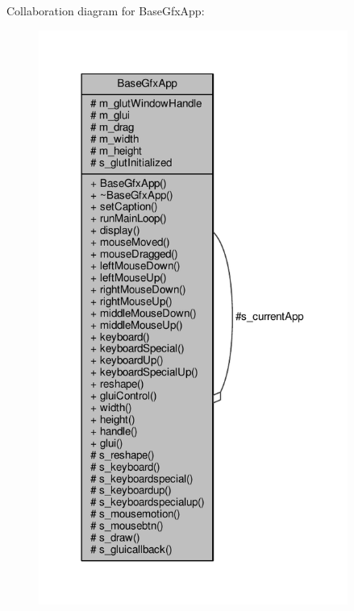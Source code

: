 Collaboration diagram for Base\-Gfx\-App\-:\nopagebreak
\begin{figure}[H]
\begin{center}
\leavevmode
\includegraphics[width=287pt]{classBaseGfxApp__coll__graph}
\end{center}
\end{figure}
